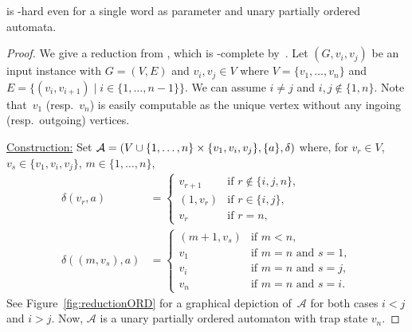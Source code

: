 \begin{proposition}
	\label{prelim:prop:finite_list_sync_word-hardness}
	\DFASW is \LOGSPACE-hard even for a single word as parameter
	and unary partially ordered automata. 	
\end{proposition}
\begin{proof}
	We give a reduction from \ORD,
	which is \LOGSPACE-complete by~.
	Let $(G, v_i, v_j)$ be an input instance
	with $G = (V, E)$ and $v_i,v_j \in V$
	where $V = \{v_1, \ldots, v_n\}$
	and $E = \{ (v_i, v_{i+1}) \mid i\in \{1,\ldots,n-1\}\}$.
	We can assume $i \ne j$ and $i,j \notin \{1,n\}$.
    Note that~$v_1$ (resp.~$v_n$) is easily computable
    as the unique vertex without any ingoing (resp.~outgoing)
    vertices.  
		
	\medskip 
	\noindent\underline{Construction:} 	Set $\mathcal A = (V \cup \{1,\ldots,n\} \times \{v_1,v_i,v_j\}, \{a\}, \delta)$
	where, for $v_r \in V$, $v_s \in \{v_1,v_i,v_j\}$, $m \in  \{1,\ldots,n\}$, 
	\begin{align*}
		\delta(v_r, a) & = \begin{cases}
			v_{r+1}        & \text{if } r \notin \{i,j,n\}, \\
			(1,v_r)        & \text{if } r \in \{i,j\}, \\
			v_r            & \text{if } r = n,
		\end{cases} \\
		\delta((m, v_s), a) & = \begin{cases}
			(m+1, v_s) & \text{if } m < n, \\
			v_1        & \text{if } m = n \text{ and } s = 1, \\
			v_i        & \text{if } m = n \text{ and } s = j, \\
			v_n        & \text{if } m = n \text{ and } s = i.
		\end{cases} 	
	\end{align*}
	See Figure~\ref{fig:reductionORD} for a graphical depiction of~$\mathcal A$ for both 
	cases $i < j$ and $i > j$.
	Now, $\mathcal A$ is a unary partially ordered automaton with trap state $v_n$.
		

\end{proof}
